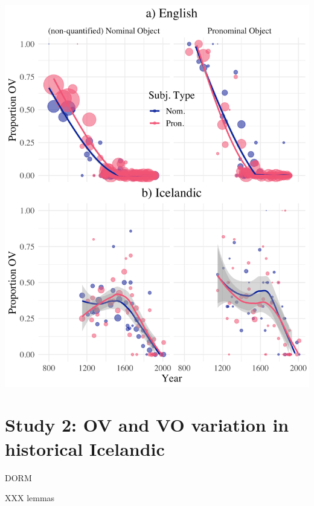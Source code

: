 \documentclass[hyperref={pdfpagelabels=false}]{beamer}
\begin{document}
\begin{frame}
	
	\begin{center}
	\includegraphics[scale = 0.5]{Fig3-4.png}
	\end{center}
\end{frame}



\section{Study 2: OV and VO variation in historical Icelandic}


\begin{frame}{DORM} 


XXX
lemmas

\end{frame}
\end{document}
